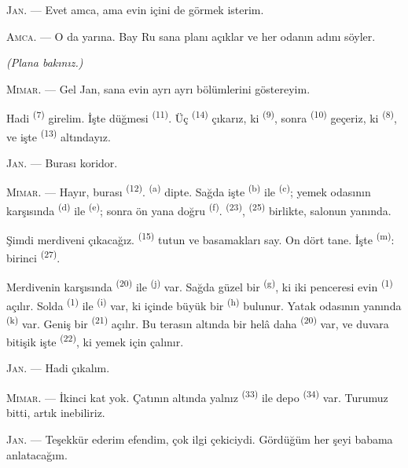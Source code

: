 \textsc{Jan}. --- Evet amca, ama evin içini de görmek isterim.

\textsc{Amca}. --- O da yarına. Bay Ru sana planı açıklar ve her odanın adını
söyler.

\VUsaut{3.0mm}
\VUsaut{2.4mm}

{\centering\textit{(Plana bakınız.)}\par}
\VUsaut{2.4mm}

\textsc{Mimar}. --- Gel Jan, sana evin ayrı ayrı bölümlerini göstereyim.

Hadi  \textsuperscript{(7)} girelim. İşte 
düğmesi \textsuperscript{(11)}. Üç 
\textsuperscript{(14)} çıkarız, ki 
\textsuperscript{(9)}, sonra  \textsuperscript{(10)} geçeriz,
ki  \textsuperscript{(8)}, ve işte 
\textsuperscript{(13)} altındayız.

\textsc{Jan}. --- Burası koridor.

\textsc{Mimar}. --- Hayır, burası  \textsuperscript{(12)}.
 \textsuperscript{(a)} dipte. Sağda işte 
\textsuperscript{(b)} ile  \textsuperscript{(c)}; yemek
odasının karşısında  \textsuperscript{(d)} ile 
\textsuperscript{(e)}; sonra ön yana doğru 
\textsuperscript{(f)}.  \textsuperscript{(23)},
 \textsuperscript{(25)} birlikte, salonun yanında.

Şimdi merdiveni çıkacağız.  \textsuperscript{(15)} tutun ve
basamakları say. On dört tane. İşte 
\textsuperscript{(m)}: birinci  \textsuperscript{(27)}.

\VUsaut{3.0mm}
\VUsaut{3.0mm}

Merdivenin karşısında  \textsuperscript{(20)} ile
 \textsuperscript{(j)} var. Sağda güzel bir
 \textsuperscript{(g)}, ki iki penceresi evin
 \textsuperscript{(1)} açılır. Solda 
\textsuperscript{(1)} ile  \textsuperscript{(i)} var,
ki içinde büyük bir  \textsuperscript{(h)} bulunur. Yatak odasının
yanında  \textsuperscript{(k)} var. Geniş bir
 \textsuperscript{(21)} açılır. Bu terasın altında bir helâ daha
\textsuperscript{(20)} var, ve duvara bitişik işte 
\textsuperscript{(22)}, ki yemek için çalınır.

\textsc{Jan}. --- Hadi  çıkalım.

\textsc{Mimar}. --- İkinci kat yok. Çatının altında yalnız
 \textsuperscript{(33)} ile depo \textsuperscript{(34)}
var. Turumuz bitti, artık inebiliriz.

\textsc{Jan}. --- Teşekkür ederim efendim, çok ilgi çekiciydi. Gördüğüm her
şeyi babama anlatacağım.
\VUsaut{4.0mm}
\VUfilet{22mm}
